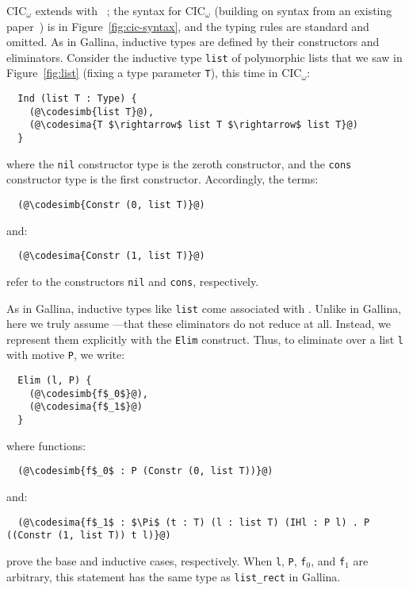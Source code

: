 CIC$_{\omega}$ extends  with ~\cite{inductive};
the syntax for CIC$_{\omega}$ (building on syntax from an existing paper~\cite{Timany2015FirstST}) is in Figure~\ref{fig:cic-syntax},
and the typing rules are standard and omitted.
As in Gallina, inductive types are defined by their constructors and eliminators.
Consider the inductive type \lstinline{list} of polymorphic lists that we saw in Figure~\ref{fig:list} (fixing a type parameter \lstinline{T}),
this time in CIC$_{\omega}$: %

\begin{lstlisting}
  Ind (list T : Type) {
    (@\codesimb{list T}@),
    (@\codesima{T $\rightarrow$ list T $\rightarrow$ list T}@)
  }
\end{lstlisting}
where the \lstinline{nil} constructor type is the zeroth constructor, and the \lstinline{cons} constructor type is the first constructor.
Accordingly, the terms:

\begin{lstlisting}
  (@\codesimb{Constr (0, list T)}@)
\end{lstlisting}
and:

\begin{lstlisting}
  (@\codesima{Constr (1, list T)}@)
\end{lstlisting}
refer to the constructors \lstinline{nil} and \lstinline{cons}, respectively.

As in Gallina, inductive types like \lstinline{list} come associated with .
Unlike in Gallina, here we truly assume ---that these eliminators
do not reduce at all.
Instead, we represent them explicitly with the \lstinline{Elim} construct.
Thus, to eliminate over a list \lstinline{l} with motive \lstinline{P},
we write: %

\begin{lstlisting}
  Elim (l, P) {
    (@\codesimb{f$_0$}@),
    (@\codesima{f$_1$}@)
  }
\end{lstlisting}
where functions:

\begin{lstlisting}
  (@\codesimb{f$_0$ : P (Constr (0, list T))}@)
\end{lstlisting}
and:

\begin{lstlisting}
  (@\codesima{f$_1$ : $\Pi$ (t : T) (l : list T) (IHl : P l) . P ((Constr (1, list T)) t l)}@)
\end{lstlisting}
prove the base and inductive cases, respectively.
When \lstinline{l}, \lstinline{P}, \lstinline{f}$_0$, and \lstinline{f}$_1$ are arbitrary,
this statement has the same type as \lstinline{list_rect} in Gallina.

